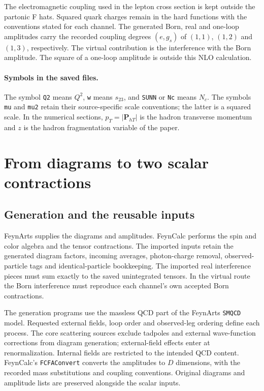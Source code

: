 \documentclass[11pt,a4paper]{article}
\begin{document}
The electromagnetic coupling used in the lepton cross section is kept
outside the partonic F hats. Squared quark charges remain in the hard
functions with the conventions stated for each channel. The generated
Born, real and one-loop amplitudes carry the recorded coupling degrees
$(e,g_s)$ of $(1,1)$, $(1,2)$ and $(1,3)$, respectively. The virtual
contribution is the interference with the Born amplitude. The square of
a one-loop amplitude is outside this NLO calculation.

\paragraph{Symbols in the saved files.}
The symbol \texttt{Q2} means $Q^2$, \texttt{w} means $s_{23}$, and
\texttt{SUNN} or \texttt{Nc} means $N_c$. The symbols \texttt{mu} and
\texttt{mu2} retain their source-specific scale conventions; the latter
is a squared scale. In the numerical sections,
$p_T=|\boldsymbol P_{hT}|$ is the hadron transverse momentum and $z$ is
the hadron fragmentation variable of the paper.

\section{From diagrams to two scalar contractions}
\label{sec:amplitudes}

\subsection{Generation and the reusable inputs}

FeynArts supplies the diagrams and amplitudes. FeynCalc performs the spin
and color algebra and the tensor contractions. The imported inputs retain
the generated diagram factors, incoming averages, photon-charge removal,
observed-particle tags and identical-particle bookkeeping.
The imported real interference pieces must sum exactly to the saved
unintegrated tensors. In the virtual route the Born interference must
reproduce each channel's own accepted Born contractions.

The generation programs use the massless QCD part of the FeynArts
\texttt{SMQCD} model. Requested external fields, loop order and
observed-leg ordering define each process. The core scattering sources
exclude tadpoles and external wave-function corrections from diagram
generation; external-field effects enter at renormalization. Internal
fields are restricted to the intended QCD content. FeynCalc's
\texttt{FCFAConvert} converts the amplitudes to $D$ dimensions, with
the recorded mass substitutions and coupling conventions. Original
diagrams and amplitude lists are preserved alongside the scalar inputs.
\end{document}
